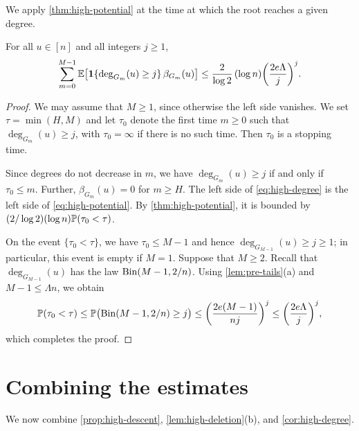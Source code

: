 We apply \cref{thm:high-potential} at the time at which the root reaches a given degree.

\begin{corollary}\label{cor:high-degree}
For all $u \in [n]$ and all integers $j \ge 1$,
\begin{equation}\label{eq:high-degree}
\sum_{m = 0}^{M - 1} \mathbb E \bigl[ \mathbf 1 \{ \deg_{G_m}(u) \ge j \} \, \beta_{G_m}(u) \bigr] \le \frac{2}{\log 2} \, (\log n) \biggl( \frac{2 e \Lambda}{j} \biggr)^j.
\end{equation}
\end{corollary}

\begin{proof}
We may assume that $M \ge 1$, since otherwise the left side vanishes. We set $\tau = \min(H, M)$ and let $\tau_0$ denote the first time $m \ge 0$ such that $\deg_{G_m}(u) \ge j$, with $\tau_0 = \infty$ if there is no such time. Then $\tau_0$ is a stopping time.

Since degrees do not decrease in $m$, we have $\deg_{G_m}(u) \ge j$ if and only if $\tau_0 \le m$. Further, $\beta_{G_m}(u) = 0$ for $m \ge H$. The left side of \eqref{eq:high-degree} is the left side of \eqref{eq:high-potential}. By \cref{thm:high-potential}, it is bounded by $(2 / \log 2) (\log n) \mathbb P(\tau_0 < \tau)$.

On the event $\{ \tau_0 < \tau \}$, we have $\tau_0 \le M - 1$ and hence $\deg_{G_{M - 1}}(u) \ge j \ge 1$; in particular, this event is empty if $M = 1$. Suppose that $M \ge 2$. Recall that $\deg_{G_{M - 1}}(u)$ has the law $\operatorname{Bin}(M - 1, 2/n)$. Using \cref{lem:pre-tails}(a) and $M - 1 \le \Lambda n$, we obtain
\[
\mathbb P(\tau_0 < \tau) \le \mathbb P \bigl( \operatorname{Bin}(M - 1, 2/n) \ge j \bigr) \le \biggl( \frac{2 e (M - 1)}{n j} \biggr)^j \le \biggl( \frac{2 e \Lambda}{j} \biggr)^j,
\]
which completes the proof.
\end{proof}

\section{Combining the estimates}\label{sec:high-main}

We now combine \cref{prop:high-descent}, \cref{lem:high-deletion}(b), and \cref{cor:high-degree}.

